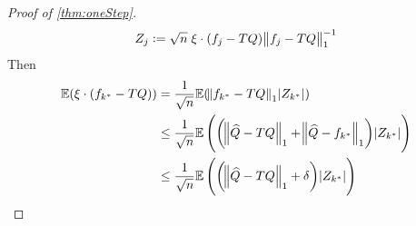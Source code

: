 \begin{proof}[Proof of \cref{thm:oneStep}]
\begin{equation}
  Z_j := \sqrt{n} \; \xi \cdot (f_j - TQ) \norm{f_j - TQ}_1^{-1}
  \end{equation}
  Then
  \begin{align*}
    \mathbb{E} ( \xi \cdot (f_{k^*} - TQ) )
    &= \frac{1}{\sqrt{n}} \mathbb{E} (\norm{f_{k^*} - TQ}_1 \abs{Z_{k^*}})
    \\ &\leq \frac{1}{\sqrt{n}}
    \mathbb{E} \left( \left(\norm{\widehat{Q} -TQ}_1 + \norm{\widehat{Q} - f_{k^*}}_1 \right)
    \abs{Z_{k^*}} \right)
    \\ &\leq \frac{1}{\sqrt{n}}
    \mathbb{E} \left( \left(\norm{\widehat{Q} -TQ}_1 + \delta \right)
    \abs{Z_{k^*}} \right)
  \end{align*}


\end{proof}

